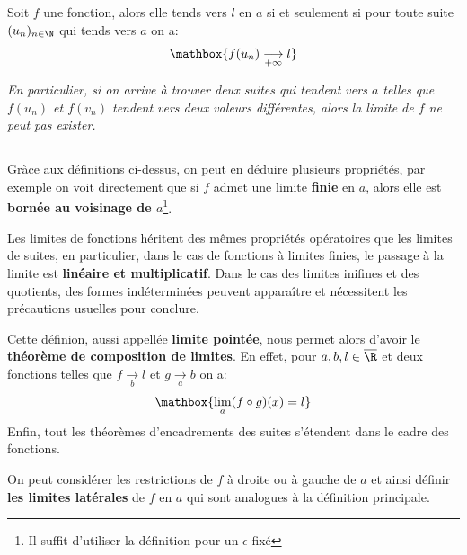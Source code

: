\subsection*{}

Soit \(f\) une fonction, alors elle tends vers \(l\) en \(a\) si et seulement si pour toute suite \((u_n)_{n \in \N}\) qui tends vers \(a\) on a:
\[
   \mathbox{f(u_n) \underset{+\infty}{\longrightarrow} l}
\] 
\begin{center}
   \textit{
      En particulier, si on arrive à trouver deux suites qui tendent vers \(a\) telles que \(f(u_n)\) et \(f(v_n)\) tendent vers deux valeurs différentes, alors la limite de \(f\) ne peut pas exister.
   }
\end{center}
\pagebreak

\subsection*{}

Gràce aux définitions ci-dessus, on peut en déduire plusieurs propriétés, par exemple on voit directement que si \(f\) admet une limite \textbf{finie} en \(a\), alors elle est \textbf{bornée au voisinage de \(a\)}\footnote[1]{Il suffit d'utiliser la définition pour un \(\epsilon\) fixé}. \<

Les limites de fonctions héritent des mêmes propriétés opératoires que les limites de suites, en particulier, dans le cas de fonctions à limites finies, le passage à la limite est \textbf{linéaire et multiplicatif}.\+
Dans le cas des limites inifines et des quotients, des formes indéterminées peuvent apparaître et nécessitent les précautions usuelles pour conclure.\<

Cette définion, aussi appellée \textbf{limite pointée}, nous permet alors d'avoir le \textbf{théorème de composition de limites}.\+
En effet, pour \(a, b, l \in \overline{\R}\) et deux fonctions telles que \(f \underset{b}{\rightarrow}l\) et \(g \underset{a}{\rightarrow}b \) on a:
\[
   \mathbox{\lim_{a} (f \circ g)(x) = l}
\]
Enfin, tout les théorèmes d'encadrements des suites s'étendent dans le cadre des fonctions.\<

On peut considérer les restrictions de \(f\) à droite ou à gauche de \(a\) et ainsi définir \textbf{les limites latérales} de \(f\) en \(a\) qui sont analogues à la définition principale.

